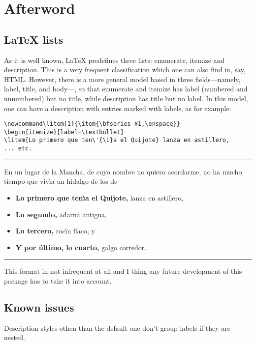 \documentclass{article}
\begin{document}
\fi

\normalsize

\section{Afterword}

\subsection{\LaTeX{} lists}

As it is well known, \LaTeX{} predefines three lists: enumerate,
itemize and description.  This is a very frequent classification which
one can also find in, say, HTML. However, there is a more general
model based in three fields---namely, label, title, and body---, so
that enumerate and itemize has label (numbered and unnumbered) but
no title, while description has title but no label. In this model,
one can have a description with entries marked with labels, as for
example:
\begin{verbatim}
\newcommand\litem[1]{\item{\bfseries #1,\enspace}}
\begin{itemize}[label=\textbullet]
\litem{Lo primero que ten\'{\i}a el Quijote} lanza en astillero,
... etc.
\end{verbatim}

\vskip6pt
\goodbreak
\hrule
\vskip6pt

\newcommand\litem[1]{\item{\bfseries #1,\enspace}}
En un lugar de la Mancha, de cuyo nombre no quiero acordarme,
no ha mucho tiempo que viv\'{\i}a un hidalgo de los de
\begin{itemize}[label=\textbullet]
\litem{Lo primero que ten\'{\i}a el Quijote} lanza en astillero,
\litem{Lo segundo} adarna antigua,
\litem{Lo tercero} roc\'{\i}n flaco, y
\litem{Y por \'{u}ltimo, lo cuarto} galgo corredor.
\end{itemize}

\vskip6pt
\goodbreak
\hrule
\vskip6pt

This format in not infrequent at all and I thing any future
development of this package has to take it into account.

\subsection{Known issues}

Description styles othen than the default one don't group
labels if they are nested.
\end{document}
